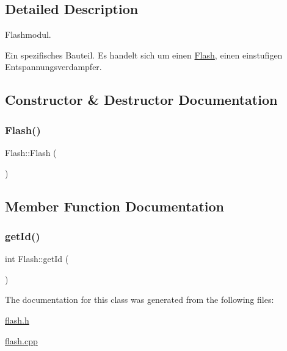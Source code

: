 \subsection{Detailed Description}
Flashmodul. 

Ein spezifisches Bauteil. Es handelt sich um einen \mbox{\hyperlink{class_flash}{Flash}}, einen einstufigen Entspannungsverdampfer. 

\subsection{Constructor \& Destructor Documentation}
\mbox{\label{class_flash_a67aac213fb3576b2a3ae1d5862f99812}} 
\subsubsection{\texorpdfstring{Flash()}{Flash()}}
{\footnotesize\ttfamily Flash\+::\+Flash (\begin{DoxyParamCaption}{ }\end{DoxyParamCaption})}



\subsection{Member Function Documentation}
\mbox{\label{class_flash_a12eecf14803a94e5081ed03c755fe5d8}} 
\subsubsection{\texorpdfstring{get\+Id()}{getId()}}
{\footnotesize\ttfamily int Flash\+::get\+Id (\begin{DoxyParamCaption}{ }\end{DoxyParamCaption})}



The documentation for this class was generated from the following files\+:\begin{DoxyCompactItemize}
\item 
\mbox{\hyperlink{flash_8h}{flash.\+h}}\item 
\mbox{\hyperlink{flash_8cpp}{flash.\+cpp}}\end{DoxyCompactItemize}
